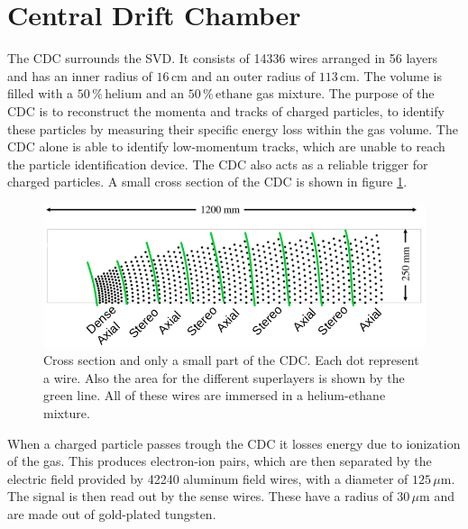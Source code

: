 \documentclass[a4paper,11pt,twosided,final,german,openbib,pdftex,listof=totoc,bibliography=totoc]{scrbook}
\begin{document}
\section{Central Drift Chamber}
\label{sec:CDC}

The CDC surrounds the SVD. It consists of 14336 wires arranged in 56 layers and has an inner radius of $16\,\textrm{cm}$ and an outer radius of $113\,\textrm{cm}$. The volume is filled with a $50\,\%\,\textrm{helium}$ and an $50\,\%\,\textrm{ethane}$ gas mixture. The purpose of the CDC is to reconstruct the momenta and tracks of charged particles, to identify these particles by measuring their specific energy loss within the gas volume. The CDC alone is able to identify low-momentum tracks, which are unable to reach the particle identification device. The CDC also acts as a reliable trigger for charged particles.\cite{B2TR} A small cross section of the CDC is shown in figure \ref{fig:CDC}.

\begin{figure}[h!] 
	\centering
	\includegraphics[width=\textwidth]{Bilder/CDC}
	\caption[Central Drift Chamber]{Cross section and only a small part of the CDC. Each dot represent a wire. Also the area for the different superlayers is shown by the green line. All of these wires are immersed in a helium-ethane mixture.\cite{CDCHauth}}
	\label{fig:CDC}
\end{figure}

When a charged particle passes trough the CDC it losses energy due to ionization of the gas. This produces electron-ion pairs, which are then separated by the electric field provided by 42240 aluminum field wires, with a diameter of $125\,\mu\textrm{m}$. The signal is then read out by the sense wires. These have a radius of $30\,\mu\textrm{m}$ and are made out of gold-plated tungsten.\cite{B2TR} 
\end{document}
